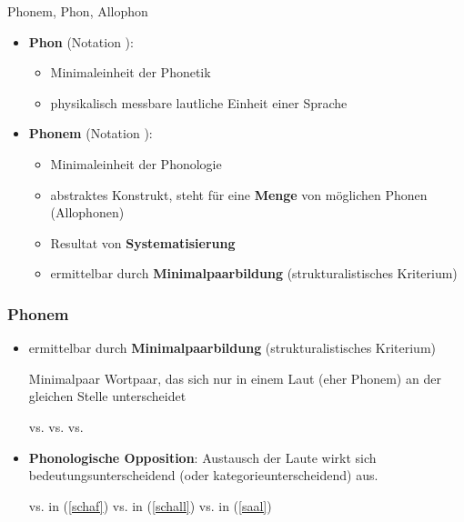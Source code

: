 \begin{frame}{Phonem, Phon, Allophon}

\begin{itemize}
	\item \textbf{Phon} (Notation \textipa{[ ]}):
	
	\begin{itemize}
		\item Minimaleinheit der Phonetik
		\item physikalisch messbare lautliche Einheit einer Sprache
	\end{itemize}
	
	\item \textbf{Phonem} (Notation \textipa{/ /}):
	
	\begin{itemize}
		\item Minimaleinheit der Phonologie
		\item abstraktes Konstrukt, steht für eine \textbf{Menge} von möglichen Phonen (Allophonen)
		\item Resultat von \textbf{Systematisierung}
		\item ermittelbar durch \textbf{Minimalpaarbildung} (strukturalistisches Kriterium)	
	\end{itemize}
	
\end{itemize}

\end{frame}


\begin{frame}
\frametitle{Phonem}

	\begin{itemize}
	
		\item ermittelbar durch \textbf{Minimalpaarbildung} (strukturalistisches Kriterium)
		
		\begin{block}{Minimalpaar}
			Wortpaar, das sich nur in einem Laut (eher Phonem) an der gleichen Stelle unterscheidet
		\end{block}
	
	\eal
		\ex \label{schaf} \textipa{[Sa:l]}   vs. \textipa{[Sa:f]}  \ras {} \vs {}
		\ex\label{schall} \textipa{[Sa:l]}  vs. \textipa{[Sal]}  \ras {} \vs {}
		\ex \label{saal} \textipa{[Sa:l]}  vs. \textipa{[za:l]}  \ras {} \vs {}
	\zl
	
		\item \textbf{Phonologische Opposition}: Austausch der Laute wirkt sich bedeutungsunterscheidend (oder kategorieunterscheidend) aus.
	
	\eal
		\ex {} vs.  in (\ref{schaf})
		\ex {} vs.  in (\ref{schall})
		\ex {} vs.  in (\ref{saal})
	\zl			
	
	\end{itemize}

\end{frame}


